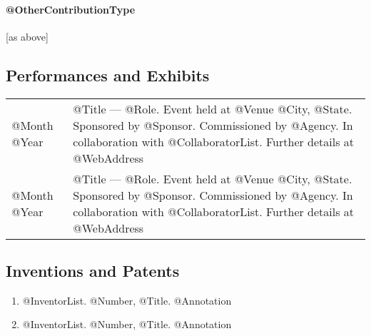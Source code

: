 \documentclass[10pt]{article}
\begin{document}
\printbibliography[title={\normalsize Book Chapters},
 type=incollection,
 keyword=nonref,
 notkeyword=electronic,
 resetnumbers=true
]

%
\printbibliography[title={\normalsize Electronic Publications},
 keyword=electronic,
 resetnumbers=true
]

\printbibliography[title={\normalsize Technical Reports},
 type=report,
 resetnumbers=true
]

\printbibliography[title={\normalsize Abstracts},
 keyword=abstract,
 resetnumbers=true
]

\printbibliography[title={\normalsize Reviews},
 keyword=review,
 resetnumbers=true
]

\paragraph{@OtherContributionType}
[as above]


\subsection*{Performances and Exhibits}
\smallskip

\begin{tabular}{l@{\quad\ }p{35em}} 
 @Month @Year
 & @Title --- @Role. Event held at @Venue @City, @State. 
   Sponsored by @Sponsor. 
   Commissioned by @Agency. 
   In collaboration with @CollaboratorList. 
   Further details at @WebAddress
   \medskip \\
 @Month @Year
 & @Title --- @Role. Event held at @Venue @City, @State. 
   Sponsored by @Sponsor. 
   Commissioned by @Agency. 
   In collaboration with @CollaboratorList. 
   Further details at @WebAddress
\end{tabular}

\subsection*{Inventions and Patents}
\smallskip
\begin{enumerate} \setlength{\itemsep}{0ex}
 \item @InventorList. @Number, @Title. @Annotation
 \item @InventorList. @Number, @Title. @Annotation
\end{enumerate}
\end{document}

